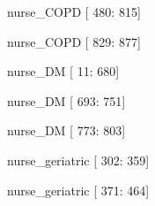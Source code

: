 \documentclass[12pt,a4paper,oneside]{article}
\begin{document}
\begin{itemize}
{ \item nurse\_COPD [ 480: 815] }%
{ \item nurse\_COPD [ 829: 877] }%
{ \item nurse\_DM [  11: 680] }%
{ \item nurse\_DM [ 693: 751] }%
{ \item nurse\_DM [ 773: 803] }%
{ \item nurse\_geriatric [ 302: 359] }%
{ \item nurse\_geriatric [ 371: 464] }%

\end{itemize}
\end{document}
